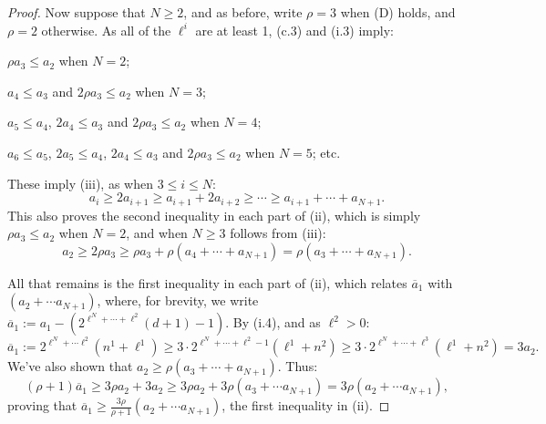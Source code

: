 \documentclass[10pt]{article}
\begin{document}
\begin{KoszulSequenceCombinatorics}
\begin{proof}
Now suppose that $N\geq2$, and as before, write $\rho=3$ when \textup{(D)} holds, and $\rho=2$ otherwise. As all of the $\ell^i$ are at least 1, \textup{(c.3)} and \textup{(i.3)} imply:
\begin{itemise}
\item $\rho a_3\leq a_2$ when $N=2$;
\item $a_4\leq a_3$ and $2\rho a_3\leq a_2$ when $N=3$;
\item $a_5\leq a_4$, $2a_4\leq a_3$ and $2\rho a_3\leq a_2$ when $N=4$;
\item $a_6\leq a_5$, $2a_5\leq a_4$, $2a_4\leq a_3$ and $2\rho a_3\leq a_2$ when $N=5$; etc.
\end{itemise}
These imply (iii), as when $3\leq i\leq N$:
\[a_i\geq 2a_{i+1}\geq a_{i+1}+2a_{i+2}\geq\cdots \geq a_{i+1}+\cdots +a_{N+1}.\]
This also proves the second inequality in each part of (ii), which is simply $\rho a_3\leq a_2$ when $N=2$, and when $N\geq3$ follows from (iii):
\[a_2\geq 2\rho a_3\geq \rho a_3+\rho (a_4+\cdots +a_{N+1})=\rho (a_3+\cdots +a_{N+1}).\]

All that remains is the first inequality in each part of (ii), which relates $\overline{a}_1$ with $(a_2+\cdots a_{N+1})$, where, for brevity, we write $\overline{a}_1:=a_1-(2^{\ell^N+\cdots +\ell^2}(d+1)-1)$.
By \textup{(i.4)}, and as $\ell^2>0$:%
\[\overline{a}_1:=2^{\ell^N+\cdots \ell^2}(n^1+\ell^1)\geq 3\cdot2^{\ell^N+\cdots +\ell^2-1}(\ell^1+n^2)\geq 3\cdot2^{\ell^N+\cdots +\ell^3}(\ell^1+n^2) =3a_2.\]
We've also shown that $a_2\geq\rho (a_3+\cdots +a_{N+1})$. Thus:
\[(\rho+1)\overline{a}_1\geq 3\rho a_2+3a_2 \geq 3\rho a_2+3\rho (a_3+\cdots a_{N+1})=3\rho(a_2+\cdots a_{N+1}),\]
proving that $\overline{a}_1\geq\frac{3\rho}{\rho+1}(a_2+\cdots a_{N+1})$,  the first inequality in (ii).
\end{proof}


\end{KoszulSequenceCombinatorics}
\end{document}
